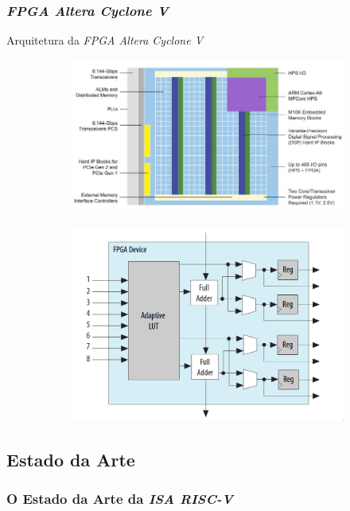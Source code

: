 \documentclass[aspectratio=169]{beamer}
\begin{document}
    \begin{frame}
        \frametitle{\textit{FPGA Altera Cyclone V}}
        \vfill
        \begin{block}{Arquitetura da \textit{FPGA Altera Cyclone V}}
        \begin{figure}[H]
            \begin{subfigure}
            \centering
                \includegraphics[width=.5\textwidth,height=.5\textheight,keepaspectratio]{../images/altera_cyclone_v_soc_architectural_downscale.jpg}
            \end{subfigure}
            \begin{subfigure}
            \centering
                \includegraphics[width=.4\textwidth,height=.5\textheight,keepaspectratio]{../images/intel_alm_high_level.png}
            \end{subfigure}
        \end{figure}
        \end{block}
        \vfill
    \end{frame}

    \subsection{Estado da Arte}
    \begin{frame}
        \frametitle{O Estado da Arte da \textit{ISA RISC-V}}
        \vfill
        {}
        \vfill
    \end{frame}
\end{document}
